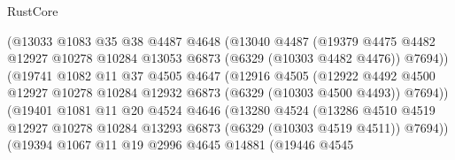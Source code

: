 \begin{lexlean}{RustCore}
\begin{coremodule}
                            (@13033
                              @1083
                              @35
                              @38
                              @4487
                              @4648
                              (@13040
                                @4487
                                (@19379
                                  @4475
                                  @4482
                                  @12927
                                  @10278
                                  @10284
                                  @13053
                                  @6873
                                  (@6329 (@10303 @4482 @4476))
                                  @7694))
                              (@19741
                                @1082
                                @11
                                @37
                                @4505
                                @4647
                                (@12916
                                  @4505
                                  (@12922
                                    @4492
                                    @4500
                                    @12927
                                    @10278
                                    @10284
                                    @12932
                                    @6873
                                    (@6329 (@10303 @4500 @4493))
                                    @7694))
                                (@19401
                                  @1081
                                  @11
                                  @20
                                  @4524
                                  @4646
                                  (@13280
                                    @4524
                                    (@13286
                                      @4510
                                      @4519
                                      @12927
                                      @10278
                                      @10284
                                      @13293
                                      @6873
                                      (@6329 (@10303 @4519 @4511))
                                      @7694))
                                  (@19394
                                    @1067
                                    @11
                                    @19
                                    @2996
                                    @4645
                                    @14881
                                    (@19446
                                      @4545

\end{coremodule}
\end{lexlean}
